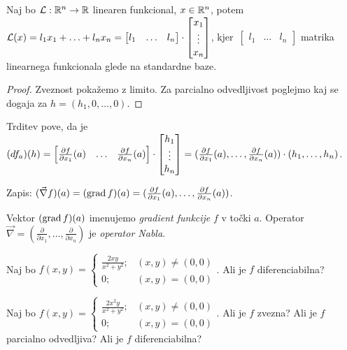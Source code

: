 \begin{opomba}
    Naj bo $\mathcal{L}: \mathbb{R}^n \to \mathbb{R}$ linearen funkcional, $x \in \mathbb{R}^n$, potem $\mathcal{L}(x) = l_1x_1+\ldots+l_nx_n = \begin{bmatrix}
        l_1 & \ldots & l_n
    \end{bmatrix} \cdot \begin{bmatrix}
        x_1 \\ \vdots \\ x_n
    \end{bmatrix}$, kjer~$\begin{bmatrix}
        l_1 & \ldots & l_n
    \end{bmatrix}$ matrika linearnega funkcionala glede na standardne baze.    
\end{opomba}

\begin{proof}
    Zveznost pokažemo z limito. Za parcialno odvedljivost poglejmo kaj se dogaja za $h = (h_1, 0, \ldots, 0)$.
\end{proof}

\begin{opomba}
    Trditev pove, da je $(df_a)(h) = \begin{bmatrix}
        \frac{\partial f}{\partial x_1}(a) & \ldots & \frac{\partial f}{\partial x_n}(a) 
    \end{bmatrix} \cdot \begin{bmatrix}
        h_1 \\ \vdots \\ h_n
    \end{bmatrix} = (\frac{\partial f}{\partial x_1}(a), \ldots, \frac{\partial f}{\partial x_n}(a)) \cdot (h_1, \ldots, h_n)$.

    Zapis: $(\vec{\nabla} f) (a) = (\operatorname{grad} f)(a) = (\frac{\partial f}{\partial x_1}(a), \ldots, \frac{\partial f}{\partial x_n}(a))$.

    Vektor $(\operatorname{grad} f)(a)$ imenujemo \emph{gradient funkcije} $f$ v točki $a$. Operator $\vec{\nabla} = (\frac{\partial}{\partial x_1}, \ldots, \frac{\partial}{\partial x_n})$ je \emph{operator Nabla}.
\end{opomba}

\begin{zgled}
    Naj bo $f(x,y) = \begin{cases}
        \frac{2xy}{x^2+y^2}; &(x,y) \neq (0,0) \\
        0; &(x,y) = (0,0)
    \end{cases}$. Ali je $f$ diferenciabilna?
\end{zgled}

\begin{zgled}
    Naj bo $f(x,y) = \begin{cases}
        \frac{2x^2y}{x^2+y^2}; &(x,y) \neq (0,0) \\
        0; &(x,y) = (0,0)
    \end{cases}$. Ali je $f$ zvezna? Ali je $f$ parcialno odvedljiva? Ali je $f$ diferenciabilna?
\end{zgled}

